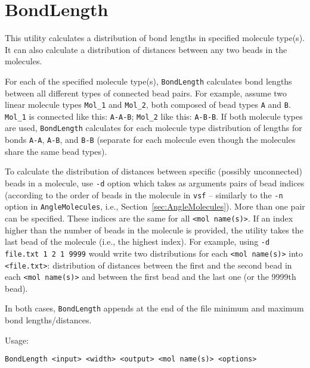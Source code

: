 \section{BondLength} \label{sec:BondLength}


This utility calculates a distribution of bond lengths in specified
molecule type(s). It can also calculate a distribution of distances between
any two beads in the molecules.

For each of the specified molecule type(s), \texttt{BondLength} calculates
bond lengths between all different types of connected bead pairs.
For example, assume two linear molecule types \texttt{Mol\_1} and
\texttt{Mol\_2}, both composed of bead types \texttt{A} and \texttt{B}.
\texttt{Mol\_1} is connected like this: \texttt{A-A-B}; \texttt{Mol\_2}
like this: \texttt{A-B-B}. If both molecule types are used,
\texttt{BondLength} calculates for each molecule type distribution of
lengths for bonds \texttt{A-A}, \texttt{A-B}, and \texttt{B-B} (separate
for each molecule even though the molecules share the same bead types).

To calculate the distribution of distances between specific (possibly
unconnected) beads in a molecule, use \texttt{-d} option which takes as
arguments pairs of bead indices (according to the order of beads in the
molecule in \texttt{vsf} -- similarly to the \texttt{-n} option in
\texttt{AngleMolecules}, i.e., Section~\ref{sec:AngleMolecules}). More than
one pair can be specified.  These indices are the same for all \texttt{<mol
name(s)>}. If an index higher than the number of beads in the molecule is
provided, the utility takes the last bead of the molecule (i.e., the
highest index). For example, using \texttt{-d file.txt 1 2 1 9999} would
write two distributions for each \texttt{<mol name(s)>} into
\texttt{<file.txt>}: distribution of distances between the first and the
second bead in each \texttt{<mol name(s)>} and between the first bead and
the last one (or the 9999th bead).

In both cases, \texttt{BondLength} appends at the end of the file minimum and
maximum bond lengths/distances.

Usage:

\vspace{1em}
\noindent
\texttt{BondLength <input> <width> <output> <mol name(s)> <options>}

